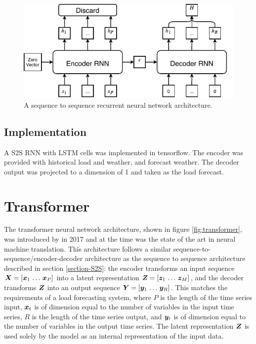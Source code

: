 \begin{figure}[htbp]
	\centerline{\includegraphics[trim=0 0cm 0 0, width=.75\textwidth]{images/S2S.pdf}}
	\caption{A sequence to sequence recurrent neural network architecture.}
	\label{fig:S2S}
\end{figure}

\subsection{Implementation}
A S2S RNN with LSTM cells was implemented in tensorflow.
The encoder was provided with historical load and weather, and forecast weather.
The decoder output was projected to a dimension of 1 and taken as the load forecast.

\section{Transformer}
The transformer neural network architecture, shown in figure \ref{fig:transformer}, was introduced by \citet{Vaswani2017} in 2017 and at the time was the state of the art in neural machine translation.
This architecture follows a similar sequence-to-sequence/encoder-decoder architecture as the sequence to sequence architecture described in section \ref{section-S2S}: the encoder transforms an input sequence ${\bm{X}} = [{\bm{x}}_1 \, \ldots \, {\bm{x}}_P]$ into a latent representation ${\bm{Z}} = [{\bm{z}}_1 \, \ldots \, {\bm{z}}_M]$, and the decoder transforms ${\bm{Z}}$ into an output sequence ${\bm{Y}} = [{\bm{y}}_1 \, \ldots \, {\bm{y}}_R]$.
This matches the requirements of a load forecasting system, where $P$ is the length of the time series input, ${\bm{x}}_t$ is of dimension equal to the number of variables in the input time series, $R$ is the length of the time series output, and ${\bm{y}}_t$ is of dimension equal to the number of variables in the output time series.
The latent representation ${\bm{Z}}$ is used solely by the model as an internal representation of the input data.

